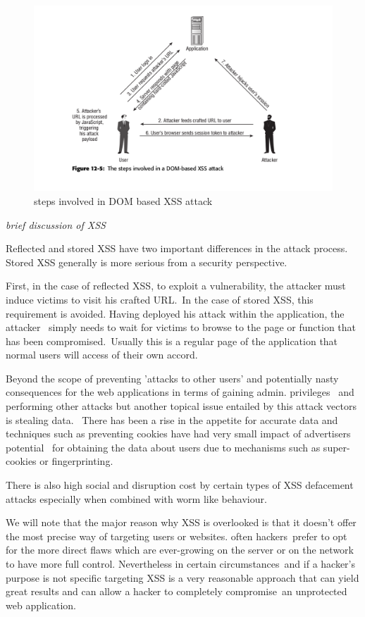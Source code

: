 \documentclass[a4paper,12pt]{paper}
\begin{document}
\begin{figure}
\centering
\includegraphics[width=1\textwidth]{DOM-XSS.png}
\caption{\label{fig:xssdom}steps involved in DOM based XSS attack}
\end{figure}

\emph{brief discussion of XSS}

Reflected and stored XSS have two important differences in the attack process. Stored XSS generally is more serious from a security perspective.

First, in the case of reflected XSS, to exploit a vulnerability, the attacker must induce victims to visit his crafted URL.\
In the case of stored XSS, this requirement is avoided. Having deployed his attack within the application, the attacker \
simply needs to wait for victims to browse to the page or function that has been compromised.\
Usually this is a regular page of the application that normal users will access of their own accord.\

Beyond the scope of preventing 'attacks to other users' and potentially nasty consequences for the web applications in terms of gaining admin. privileges \
and performing other attacks but another topical issue entailed by this attack vectors is stealing data. \
There has been a rise in the appetite for accurate data and techniques such as preventing cookies have had very small impact of advertisers potential \
for obtaining the data about users due to mechanisms such as super-cookies or fingerprinting. \

There is also high social and disruption cost by certain types of XSS defacement attacks especially when combined with worm like behaviour.\

We will note that the major reason why XSS is overlooked is that it doesn't offer the most precise way of targeting users or websites. often hackers\
prefer to opt for the more direct flaws which are ever-growing on the server or on the network to have more full control. Nevertheless in certain circumstances\
and if a hacker's purpose is not specific targeting XSS is a very reasonable approach that can yield great results and can allow a hacker to completely compromise\
an unprotected web application.\
\end{document}
